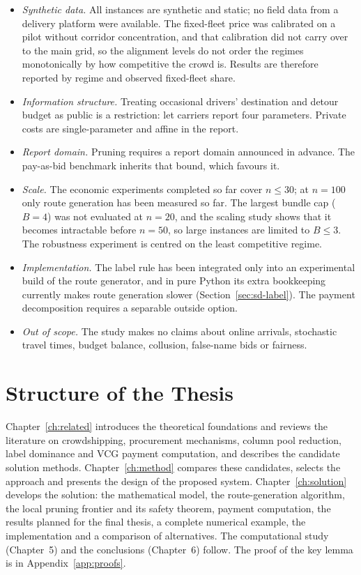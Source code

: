 \begin{itemize}[leftmargin=*,itemsep=2pt]
\item \emph{Synthetic data.} All instances are synthetic and static; no
field data from a delivery platform were available. The fixed-fleet price
was calibrated on a pilot without corridor concentration, and that
calibration did not carry over to the main grid, so the alignment levels do
not order the regimes monotonically by how competitive the crowd is. Results
are therefore reported by regime and observed fixed-fleet share.
\item \emph{Information structure.} Treating occasional drivers' destination
and detour budget as public is a restriction: \citet{li2026auction} let
carriers report four parameters. Private costs are single-parameter and
affine in the report.
\item \emph{Report domain.} Pruning requires a report domain announced in
advance. The pay-as-bid benchmark inherits that bound, which favours it.
\item \emph{Scale.} The economic experiments completed so far cover
$n\le 30$; at $n=100$ only route generation has been measured so far. The
largest bundle cap ($B=4$) was not evaluated at $n=20$, and the scaling study
shows that it becomes intractable before $n=50$, so large instances are
limited to $B\le 3$. The robustness experiment is centred on the least
competitive regime.
\item \emph{Implementation.} The label rule has been integrated only into an
experimental build of the route generator, and in pure Python its extra
bookkeeping currently makes route generation slower
(Section~\ref{sec:sd-label}). The payment decomposition requires a
separable outside option.
\item \emph{Out of scope.} The study makes no claims about online arrivals,
stochastic travel times, budget balance, collusion, false-name bids or
fairness.
\end{itemize}

\section{Structure of the Thesis}

Chapter~\ref{ch:related} introduces the theoretical foundations and reviews
the literature on crowdshipping, procurement mechanisms, column pool
reduction, label dominance and VCG payment computation, and describes the
candidate solution methods. Chapter~\ref{ch:method} compares these
candidates, selects the approach and presents the design of the proposed
system. Chapter~\ref{ch:solution} develops the solution: the mathematical
model, the route-generation algorithm, the local pruning frontier and its
safety theorem, payment computation, the results planned for the final
thesis, a complete numerical example, the implementation and a comparison of
alternatives. The computational study (Chapter~5) and the conclusions
(Chapter~6) follow. The proof of the key lemma is in
Appendix~\ref{app:proofs}.
